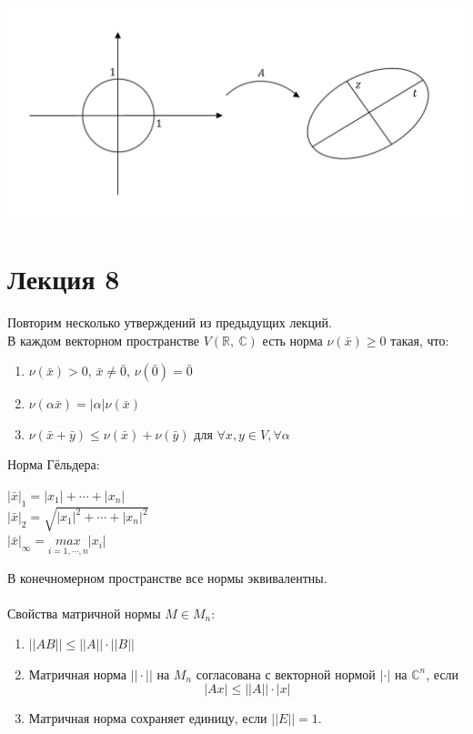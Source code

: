 \documentclass[12pt]{article}
\theoremstyle{definition}
\numberwithin{equation}{section}
\begin{document}
\begin{enumerate}
\begin{center}
\includegraphics[scale=0.6]{l7_4.png}
\end{center}
\end{enumerate}

\section *{Лекция 8}
\noindent Повторим несколько утверждений из предыдущих лекций.\\
В каждом векторном пространстве $V(\mathbb{R},~\mathbb{C})$ есть норма $\nu(\bar x)\geqslant 0$ такая, что:\begin{enumerate}
\item $\nu(\bar x) > 0$, $\bar x \neq \bar 0$, $\nu(\bar 0) = \bar 0$
\item $\nu(\alpha \bar x) = |\alpha|\nu(\bar x)$
\item $\nu(\bar x + \bar y) \leq \nu(\bar x) + \nu(\bar y)$ для $\forall x, y \in V, \forall \alpha$
\end{enumerate}
Норма Гёльдера: \begin{center}
$|\bar x|_1=|x_1|+\cdots +|x_n|$\\
$|\bar x|_2=\sqrt{|x_1|^2+\cdots +|x_n|^2}$\\
$|\bar x|_{\infty}=\underset{i=1,\cdots,n}{max}|x_i|$ \end{center}
В конечномерном пространстве все нормы эквивалентны.\\
\\
Свойства матричной нормы $M\in M_n$: 
\begin{enumerate}
    \item $||AB||\leqslant ||A||\cdot ||B||$
    \item Матричная норма $||\cdot||$ на $M_n$ согласована с векторной нормой $|\cdot|$ на $\mathbb{C}^n$, если $$|Ax|\leqslant ||A||\cdot |x|$$
    \item Матричная норма сохраняет единицу, если $||E||=1$.
\end{enumerate}
\end{document}

